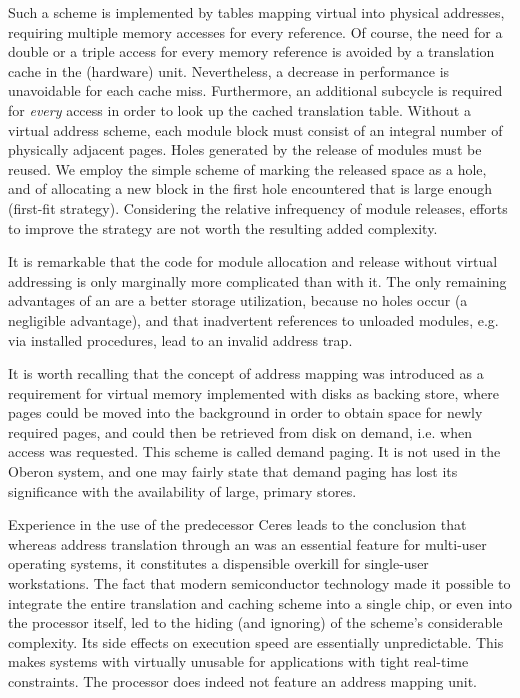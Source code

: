 Such a scheme is implemented by tables mapping virtual into physical addresses, requiring multiple memory accesses for every reference. Of course, the need for a double or a triple access for every memory reference is avoided by a translation cache in the (hardware) unit. Nevertheless, a decrease in performance is unavoidable for each cache miss. Furthermore, an additional subcycle is required for \emph{every} access in order to look up the cached translation table. Without a virtual address scheme, each module block must consist of an integral number of physically adjacent pages. Holes generated by the release of modules must be reused. We employ the simple scheme of marking the released space as a hole, and of allocating a new block in the first hole encountered that is large enough (first-fit strategy). Considering the relative infrequency of module releases, efforts to improve the strategy are not worth the resulting added complexity.

It is remarkable that the code for module allocation and release without virtual addressing is only marginally more complicated than with it. The only remaining advantages of an \MMU are a better storage utilization, because no holes occur (a negligible advantage), and that inadvertent references to unloaded modules, e.g. via installed procedures, lead to an invalid address trap.

It is worth recalling that the concept of address mapping was introduced as a requirement for virtual memory implemented with disks as backing store, where pages could be moved into the background in order to obtain space for newly required pages, and could then be retrieved from disk on demand, i.e. when access was requested. This scheme is called demand paging. It is not used in the Oberon system, and one may fairly state that demand paging has lost its significance with the availability of large, primary stores.

Experience in the use of the \RISC predecessor Ceres leads to the conclusion that whereas address translation through an \MMU was an essential feature for multi-user operating systems, it constitutes a dispensible overkill for single-user workstations. The fact that modern semiconductor technology made it possible to integrate the entire translation and caching scheme into a single chip, or even into the processor itself, led to the hiding (and ignoring) of the scheme's considerable complexity. Its side effects on execution speed are essentially unpredictable. This makes systems with \MMU virtually unusable for applications with tight real-time constraints. The \RISC processor does indeed not feature an address mapping unit.

